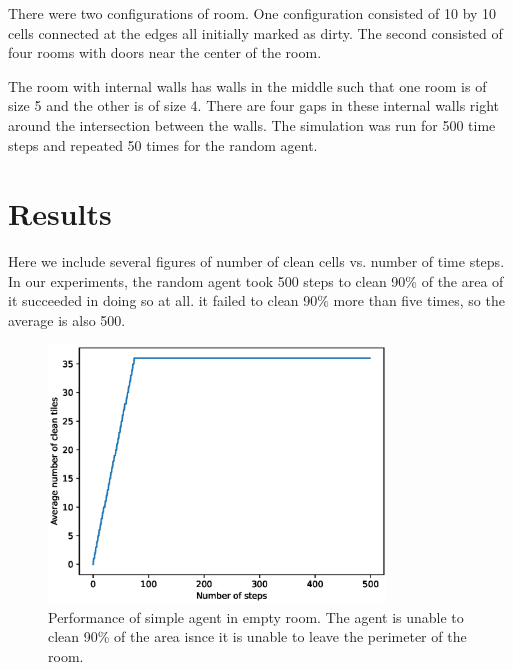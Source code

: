 \documentclass{article}
\begin{document}
There were two configurations of room. One configuration consisted of 10 by 10 cells connected at the edges  all initially marked as dirty. The second consisted of four rooms with doors near the center of the room. 


The room with internal walls has walls in the middle such that one room is of size 5 and the other is of size 4. There are four gaps in these internal walls right around the intersection between the walls.  The simulation was run for 500 time steps and repeated 50 times for the random agent. 
\section{Results}
Here we include several figures of number of clean cells vs. number of time steps.  In our experiments, the random agent took 500 steps to clean 90\% of the area of it succeeded in doing so at all. it failed to clean 90\% more than five times, so the average is also 500.

\begin{figure}
  \centering

  \includegraphics[width=0.8\textwidth]{SimpleNoWallPerformance}
  \caption{Performance of simple agent in empty room. The agent is unable to clean 90\% of the area isnce it is unable to leave the perimeter of the room. }
  \label{fig:SimpleNoWall}
\end{figure}
\end{document}
